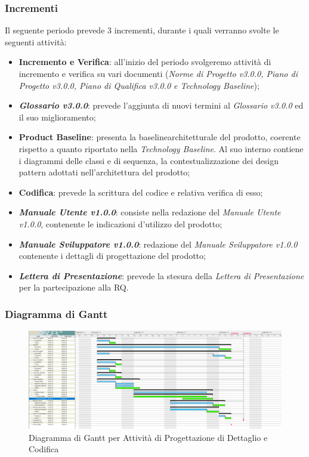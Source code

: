 \subsubsection{Incrementi}
Il seguente periodo prevede 3 incrementi, durante i quali verranno svolte le seguenti attività:
\begin{itemize}
	\item \textbf{Incremento e Verifica}: all'inizio del periodo svolgeremo attività di incremento e verifica su vari documenti (\textit{Norme di Progetto v3.0.0, Piano di Progetto v3.0.0, Piano di Qualifica v3.0.0 e Technology Baseline});
	\item \textbf{\textit{Glossario v3.0.0}}: prevede l'aggiunta di nuovi termini al \textit{Glossario v3.0.0} ed il suo miglioramento;
	\item \textbf{Product Baseline}\glossario: presenta la baseline\glossario architetturale del prodotto, coerente rispetto a quanto riportato nella \textit{Technology Baseline}. Al suo interno contiene i diagrammi delle classi e di sequenza, la contestualizzazione dei design pattern adottati nell'architettura del prodotto; 
	\item \textbf{Codifica}: prevede la scrittura del codice e relativa verifica di esso;
	\item \textbf{\textit{Manuale Utente v1.0.0}}: consiste nella redazione del \textit{Manuale Utente v1.0.0}, contenente le indicazioni d'utilizzo del prodotto;
	\item \textbf{\textit{Manuale Sviluppatore v1.0.0}}: redazione del \textit{Manuale Sviluppatore v1.0.0} contenente i dettagli di progettazione del prodotto; 	
	\item \textbf{\textit{Lettera di Presentazione}}: prevede la stesura della \textit{Lettera di Presentazione} per la partecipazione alla RQ.
\end{itemize}


\begin{landscape}
\subsubsection{Diagramma di Gantt}
\begin{figure}[h]
	\centering
  		\includegraphics[width=1.0\linewidth]{./images/DettaglioeCodifica.png}
  		\caption{Diagramma di Gantt per Attività di Progettazione di Dettaglio e Codifica}
  		\label{fig:Gantt Progettazione di dettaglio e codifica}
\end{figure}
\end{landscape}

